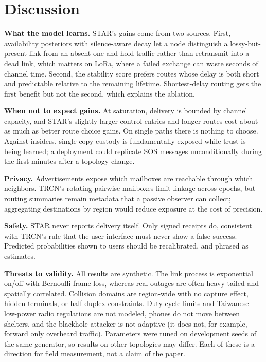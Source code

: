 \documentclass[jou,a4paper,11pt,floatsintext]{apa7}
\begin{document}
\section{Discussion}

\textbf{What the model learns.} STAR's gains come from two sources. First, availability posteriors with silence-aware decay let a node distinguish a lossy-but-present link from an absent one and hold traffic rather than retransmit into a dead link, which matters on LoRa, where a failed exchange can waste seconds of channel time. Second, the stability score prefers routes whose delay is both short and predictable relative to the remaining lifetime. Shortest-delay routing gets the first benefit but not the second, which explains the ablation.

\textbf{When not to expect gains.} At saturation, delivery is bounded by channel capacity, and STAR's slightly larger control entries and longer routes cost about as much as better route choice gains. On single paths there is nothing to choose. Against insiders, single-copy custody is fundamentally exposed while trust is being learned; a deployment could replicate SOS messages unconditionally during the first minutes after a topology change.

\textbf{Privacy.} Advertisements expose which mailboxes are reachable through which neighbors. TRCN's rotating pairwise mailboxes limit linkage across epochs, but routing summaries remain metadata that a passive observer can collect; aggregating destinations by region would reduce exposure at the cost of precision.

\textbf{Safety.} STAR never reports delivery itself. Only signed receipts do, consistent with TRCN's rule that the user interface must never show a false success. Predicted probabilities shown to users should be recalibrated, and phrased as estimates.

\textbf{Threats to validity.} All results are synthetic. The link process is exponential on/off with Bernoulli frame loss, whereas real outages are often heavy-tailed and spatially correlated. Collision domains are region-wide with no capture effect, hidden terminals, or half-duplex constraints. Duty-cycle limits and Taiwanese low-power radio regulations \parencite{ncclp0002} are not modeled, phones do not move between shelters, and the blackhole attacker is not adaptive (it does not, for example, forward only overheard traffic). Parameters were tuned on development seeds of the same generator, so results on other topologies may differ. Each of these is a direction for field measurement, not a claim of the paper.
\end{document}
